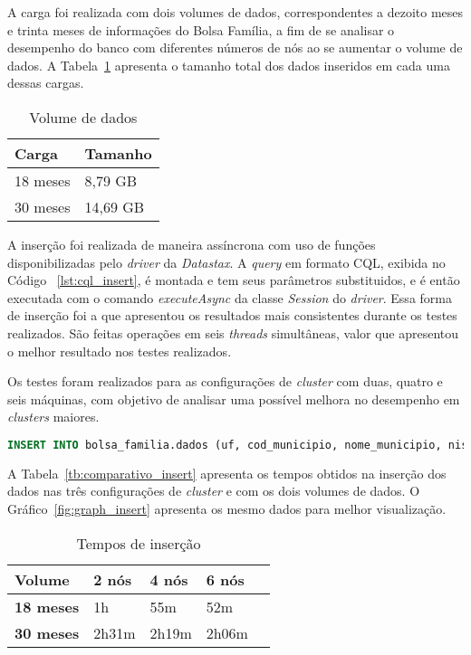 A carga foi realizada com dois volumes de dados, correspondentes a dezoito meses e trinta meses de informações do Bolsa Família, a fim de se analisar o desempenho do banco com diferentes números de nós ao se aumentar o volume de dados. A Tabela~\ref{tab:volume} apresenta o tamanho total dos dados inseridos em cada uma dessas cargas.

\begin{table}[]
	\centering
	\caption{Volume de dados}
	\label{tab:volume}
	\begin{tabular}{ll}
		\textbf{Carga} & \textbf{Tamanho} \\ \hline
		18 meses     &  8,79 GB              \\ \hline
		30 meses    &  14,69 GB             \\ \hline
	\end{tabular}
\end{table}

A inserção foi realizada de maneira assíncrona com uso de funções disponibilizadas pelo \emph{driver} da \emph{Datastax}. A \emph{query} em formato CQL, exibida no Código ~\ref{lst:cql_insert}, é montada e tem seus parâmetros substituidos, e é então executada com o comando \emph{executeAsync} da classe \emph{Session} do \emph{driver}. Essa forma de inserção foi a que apresentou os resultados mais consistentes durante os testes realizados. São feitas operações em seis \emph{threads} simultâneas, valor que apresentou o melhor resultado nos testes realizados.

Os testes foram realizados para as configurações de \emph{cluster} com duas, quatro e seis máquinas, com objetivo de analisar uma possível melhora no desempenho em \emph{clusters} maiores.

\begin{lstlisting}[caption={Código CQL para inserção},label={lst:cql_insert},language=SQL]
INSERT INTO bolsa_familia.dados (uf, cod_municipio, nome_municipio, nis_favorecido, nome_favorecido, fonte, valor, periodo) VALUES (?, ?, ?, ?, ?, ?, ?, ?)
\end{lstlisting}

A Tabela~\ref{tb:comparativo_insert} apresenta os tempos obtidos na inserção dos dados nas três configurações de \emph{cluster} e com os dois volumes de dados. O Gráfico~\ref{fig:graph_insert} apresenta os mesmo dados para melhor visualização.


\begin{table}[]
	\centering
	\caption{Tempos de inserção}
	\label{tb:tempo_insert}
	\begin{tabular}{lllll}
		\textbf{Volume}		& \textbf{2 nós} & \textbf{4 nós} & \textbf{6 nós} \\ \hline
		\textbf{18 meses}   & 1h         	 & 55m       	  & 52m            \\ \hline
		\textbf{30 meses}   & 2h31m      	 & 2h19m          & 2h06m          \\ \hline
	\end{tabular}
\end{table}

